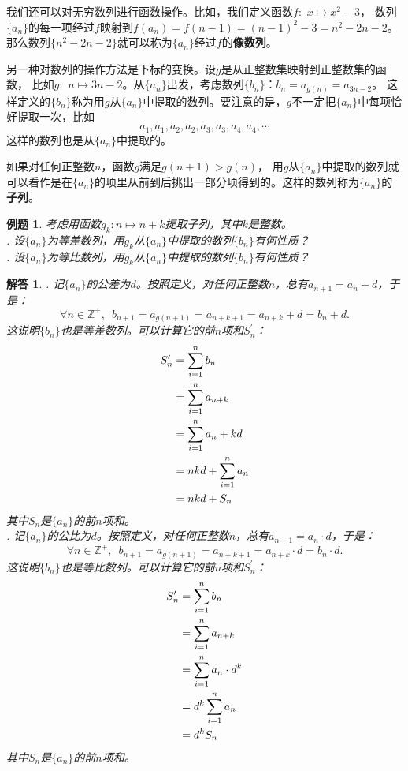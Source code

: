 \documentclass[12pt,UTF8]{ctexbook}
\newtheorem{et}{例题}[section]
\newtheorem*{so}{解答}
\begin{document}
我们还可以对无穷数列进行函数操作。比如，我们定义函数$f:\,\,x\mapsto x^2 - 3$，
数列$\{a_n\}$的每一项经过$f$映射到$f(a_n) = f(n-1) = (n-1)^2 - 3 = n^2 - 2n - 2$。
那么数列$\{n^2-2n-2\}$就可以称为$\{a_n\}$经过$f$的\textbf{像数列}。

另一种对数列的操作方法是下标的变换。设$g$是从正整数集映射到正整数集的函数，
比如$g:\,\, n \mapsto 3n - 2$。从$\{a_n\}$出发，考虑数列$\{b_n\}$：$b_n = a_{g(n)} = a_{3n-2}$。
这样定义的$\{b_n\}$称为用$g$从$\{a_n\}$中提取的数列。要注意的是，$g$不一定把$\{a_n\}$中每项恰好提取一次，比如
$$ a_1, a_1, a_2, a_2, a_3, a_3, a_4, a_4, \cdots $$
这样的数列也是从$\{a_n\}$中提取的。

如果对任何正整数$n$，函数$g$满足$g(n+1) > g(n)$，
用$g$从$\{a_n\}$中提取的数列就可以看作是在$\{a_n\}$的项里从前到后挑出一部分项得到的。这样的数列称为$\{a_n\}$的\textbf{子列}。

\begin{et}
    考虑用函数$g_k: n\mapsto n + k$提取子列，其中$k$是整数。\\
    . 设$\{a_n\}$为等差数列，用$g_k$从$\{a_n\}$中提取的数列$\{b_n\}$有何性质？\\
    . 设$\{a_n\}$为等比数列，用$g_k$从$\{a_n\}$中提取的数列$\{b_n\}$有何性质？
\end{et}
\begin{so}
    . 记$\{a_n\}$的公差为$d$。按照定义，对任何正整数$n$，总有$a_{n+1} = a_n + d$，于是：
    $$ \forall n\in \mathbb{Z}^+, \,\,\, b_{n+1} = a_{g(n+1)} = a_{n+k+1} = a_{n+k} + d = b_n + d.$$
    这说明$\{b_n\}$也是等差数列。可以计算它的前$n$项和$S_n^\prime$：
    \begin{align}
        S_n^\prime &= \sum_{i=1}^n b_n \notag \\
            &= \sum_{i=1}^n a_{n+k} \notag \\
            &= \sum_{i=1}^n a_{n} + kd \notag \\
            &= nkd + \sum_{i=1}^n a_{n} \notag \\
            &= nkd + S_n \notag
    \end{align}
    其中$S_n$是$\{a_n\}$的前$n$项和。\\
    . 记$\{a_n\}$的公比为$d$。按照定义，对任何正整数$n$，总有$a_{n+1} = a_n \cdot d$，于是：
    $$ \forall n\in \mathbb{Z}^+, \,\,\, b_{n+1} = a_{g(n+1)} = a_{n+k+1} = a_{n+k} \cdot d = b_n \cdot d.$$
    这说明$\{b_n\}$也是等比数列。可以计算它的前$n$项和$S_n^\prime$：
    \begin{align}
        S_n^\prime &= \sum_{i=1}^n b_n \notag \\
            &= \sum_{i=1}^n a_{n+k} \notag \\
            &= \sum_{i=1}^n a_{n} \cdot d^k \notag \\
            &= d^k \sum_{i=1}^n a_{n} \notag \\
            &= d^k S_n \notag
    \end{align}
    其中$S_n$是$\{a_n\}$的前$n$项和。\\
\end{so}
\end{document}

